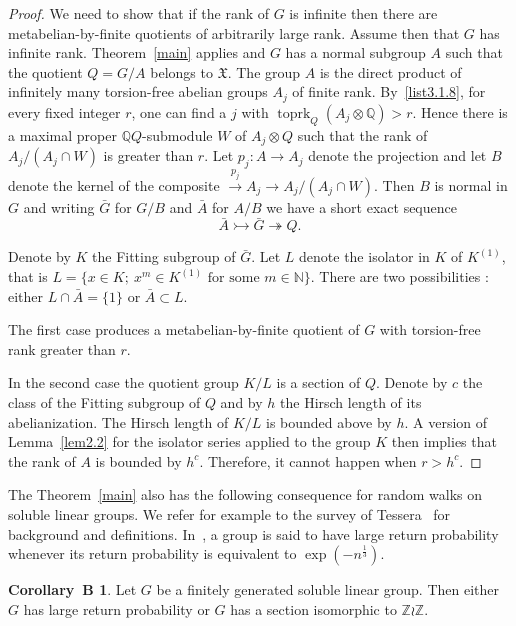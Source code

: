 \documentclass[11pt]{article}
\theoremstyle{definition}
\newcommand{\enoncename}{}
\newtheorem{corpusenonce}[theo]{\enoncename}
\newenvironment{enonce}[1]{\renewcommand{\enoncename}{#1}\begin{corpusenonce}}{\end{corpusenonce}}
\numberwithin{equation}{section}
\numberwithin{figure}{section}
\numberwithin{table}{section}
\newtheorem{corob}{Corollary~B\!}
\newcommand{\Q}{\mathbb{Q}}
\newcommand{\Z}{\mathbb{Z}}
\newcommand{\N}{\mathbb{N}}
\newcommand{\mono}{\rightarrowtail}
\newcommand{\epi}{\twoheadrightarrow}
\DeclareMathOperator{\toprk}{toprk}
\begin{document}
\begin{proof}
We need to show that if the rank of $G$ is infinite then there are metabelian-by-finite quotients of arbitrarily large rank. Assume then that $G$ has infinite rank. Theorem~\ref{main} applies and $G$ has a normal subgroup $A$ such that the quotient $Q = G/A$ belongs to $\mathfrak X$. The group $A$ is the direct product of infinitely many torsion-free abelian groups $A_j$ of finite rank.
By~\eqref{list3.1.8}, for every fixed integer $r$, one can find a $j$ with $\toprk_Q(A_j\otimes\Q) > r$. Hence there is a maximal proper $\Q Q$-submodule $W$ of $A_j\otimes Q$ such that the rank of $A_j/(A_j\cap W)$ is greater than $r$. Let $p_j:A\to A_j$ denote the projection and let $B$ denote the kernel of the composite $\stackrel{p_j}{\to} A_j\to A_j/(A_j\cap W)$. Then $B$ is normal in $G$ and writing $\bar G$ for $G/B$ and $\bar A$ for $A/B$ we have a short exact sequence
\[
\bar A \mono \bar G \epi Q.
\]

Denote by $K$ the Fitting subgroup of $\bar G$. Let $L$ denote the isolator in $K$ of $K^{(1)}$, that is $L=\{x\in K;\ x^m\in K^{(1)}\text{ for some }m\in\N\}$. There are two possibilities : either $L\cap \bar A = \{1\}$ or $\bar A \subset L$.

The first case produces a metabelian-by-finite quotient of $G$ with torsion-free rank greater than $r$.

In the second case the quotient group $K/L$ is a section of $Q$. Denote by $c$ the class of the Fitting subgroup of $Q$ and by $h$ the Hirsch length of its abelianization. The Hirsch length of $K/L$ is bounded above by $h$. A version of Lemma~\ref{lem2.2} for the isolator series applied to the group $K$ then implies that the rank of $A$ is bounded by $h^c$. Therefore, it cannot happen when $r>h^c$.
\end{proof}

The Theorem~\ref{main} also has the following consequence for random walks on soluble linear groups. We refer for example to the survey of Tessera~\cite{Tsurvey} for background and definitions. In~\cite{J}, a group is said to have large return probability whenever its return probability is equivalent to $\exp(-n^\frac1{3})$.

\begin{corob}\label{corob3}
Let $G$ be a finitely generated soluble linear group. Then either $G$ has large return probability or $G$ has a section isomorphic to $\Z\wr\Z$.
\end{corob}
\end{document}
